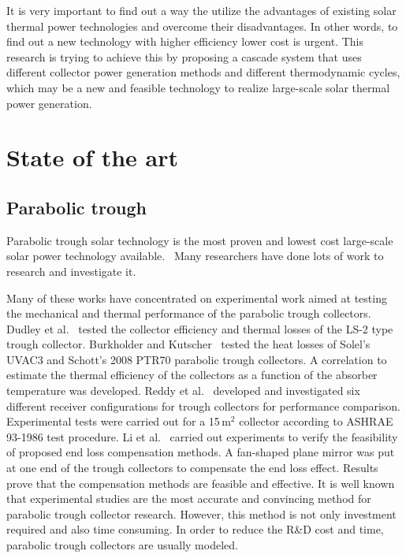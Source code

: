 It is very important to find out a way the utilize the advantages of existing solar thermal power technologies and overcome their disadvantages. In other words, to find out a new technology with higher efficiency lower cost is urgent.
This research is trying to achieve this by proposing a cascade system that uses different collector power generation methods and different thermodynamic cycles, which may be a new and feasible technology to realize large-scale solar thermal power generation.

\section{State of the art}

\subsection{Parabolic trough}\label{sec:pt}

Parabolic trough solar technology is the most proven and lowest cost large-scale solar power technology available.~\cite{Price2002}
Many researchers have done lots of work to research and investigate it. 

Many of these works have concentrated on experimental work aimed at testing the mechanical and thermal performance of the parabolic trough collectors. Dudley et al.~\cite{Dudley1994} tested the collector efficiency and thermal losses of the LS-2 type trough collector. Burkholder and Kutscher~\cite{Burkholder2009} tested the heat losses of Solel's UVAC3 and Schott's 2008 PTR70 parabolic trough collectors. A correlation to estimate the thermal efficiency of the collectors as a function of the absorber temperature was developed. Reddy et al.~\cite{Reddy2015b} developed and investigated six different receiver configurations for trough collectors for performance comparison. Experimental tests were carried out for a 15$\,\mathrm{m^2}$ collector according to ASHRAE 93-1986 test procedure.
Li et al.~\cite{Li2015} carried out experiments to verify the feasibility of proposed end loss compensation methods. A fan-shaped plane mirror was put at one end of the trough collectors to compensate the end loss effect. Results prove that the compensation methods are feasible and effective.
It is well known that experimental studies are the most accurate and convincing method for parabolic trough collector research. However, this method is not only investment required and also time consuming. In order to reduce the R\&D cost and time, parabolic trough collectors are usually modeled.

